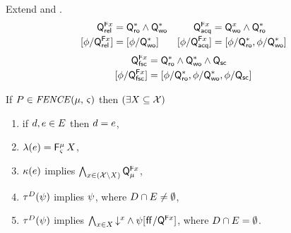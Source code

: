 \begin{definition}
  Extend  and .
  \begin{align*}
    \QF{\aLoc}{\mREL}
    &=\Qr{*}\land\Qw{*} 
    &
    \QF{\aLoc}{\mACQ}
    &=\Qw{\aLoc}\land \Qr{*}
    \\
    [\aForm/\QF{\aLoc}{\mREL}]
    &= [\aForm/\Qw{*}]
    &{}
    [\aForm/\QF{\aLoc}{\mACQ}]
    &= [\aForm/\Qr{*},\aForm/\Qw{*}]
  \end{align*}
  \begin{align*}
    \QF{\aLoc}{\mFSC}
    &= \Qr{*}\land\Qw{*} \land\Qsc
    \\
    [\aForm/\QF{\aLoc}{\mFSC}] 
    &= [\aForm/\Qr{*},\aForm/\Qw{*},\aForm/\Qsc]
  \end{align*}
\end{definition}

If $\aPS \in \sFENCE[\ascope]{\amode}$ then
$(\exists X\subseteq\mathcal{X})$
\begin{enumerate}[resume]
\item%
  if $d,e\in E$ then $d=e$,
\item%
  $\labelingAct(\aEv) = \DG[\ascope]{\amode}{\aLocs}$,
\item%
  $\kappa(e)$ implies $\bigwedge_{x\in (\mathcal{X}\setminus X)}\smash{\mathsf{Q}_{\mu}^{\mathsf{F}x}}$,
\item%
  $\aTr{\bEvs}{\bForm}$ implies $\psi$, where $D\cap E\neq\emptyset$,
\item%
  $\aTr{\cEvs}{\bForm}$ implies $\bigwedge_{x\in X}\mathord{\downarrow^{x}} \land\psi[\mkern.6mu\mathsf{ff}\mkern.6mu/\smash{\mathsf{Q}_{}^{\mathsf{F}x}}]$, where $D\cap E=\emptyset$.
\end{enumerate}

